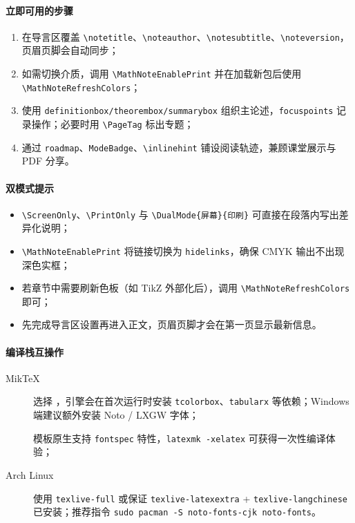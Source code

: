 \documentclass[a4paper,11pt]{ctexart}
\begin{document}
\paragraph*{立即可用的步骤}
\begin{enumerate}
    \item 在导言区覆盖 \texttt{\textbackslash notetitle}、\texttt{\textbackslash noteauthor}、\texttt{\textbackslash notesubtitle}、\texttt{\textbackslash noteversion}，页眉页脚会自动同步；
    \item {}
          如需切换介质，调用 \texttt{\textbackslash MathNote\allowbreak Enable\allowbreak Print} 并在加载新包后使用 \texttt{\textbackslash MathNote\allowbreak Refresh\allowbreak Colors}；
    \item 使用 \texttt{definitionbox/\allowbreak theorembox/\allowbreak summarybox} 组织主论述，\texttt{focuspoints} 记录操作；必要时用 \texttt{\textbackslash Page\allowbreak Tag} 标出专题；
    \item 通过 \texttt{roadmap}、\texttt{ModeBadge}、\texttt{\textbackslash inlinehint} 铺设阅读轨迹，兼顾课堂展示与 PDF 分享。
\end{enumerate}

\paragraph*{双模式提示}
\begin{itemize}
    \item \texttt{\textbackslash ScreenOnly}、\texttt{\textbackslash PrintOnly} 与 \texttt{\textbackslash DualMode\{屏幕\}\{印刷\}} 可直接在段落内写出差异化说明；
    \item \texttt{\textbackslash MathNote\allowbreak Enable\allowbreak Print} 将链接切换为 \texttt{hidelinks}，确保 CMYK 输出不出现深色实框；
    \item 若章节中需要刷新色板（如 TikZ 外部化后），调用 \texttt{\textbackslash MathNote\allowbreak Refresh\allowbreak Colors} 即可；
    \item 先完成导言区设置再进入正文，页眉页脚才会在第一页显示最新信息。
\end{itemize}

\paragraph*{编译栈互操作}
\begin{description}
    \item[MikTeX] 选择 \XeLaTeX，引擎会在首次运行时安装 \texttt{tcolorbox}、\texttt{tabularx} 等依赖；Windows 端建议额外安装 Noto / LXGW 字体；
    \item[\XeLaTeX] 模板原生支持 \texttt{fontspec} 特性，\texttt{latexmk -xelatex} 可获得一次性编译体验；
    \item[Arch Linux] 使用 \texttt{texlive-full} 或保证 \texttt{texlive-latexextra} + \texttt{texlive-langchinese} 已安装；推荐指令 \texttt{sudo pacman -S noto-fonts-cjk noto-fonts}。
\end{description}
\end{document}
